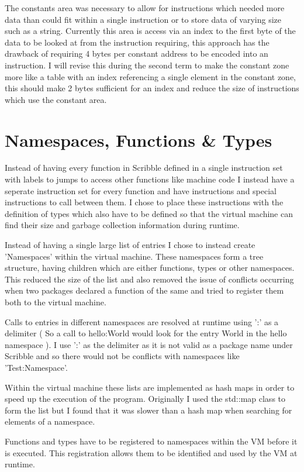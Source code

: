 \documentclass[]{final_report}
\begin{document}
The constants area was necessary to allow for instructions which needed more data than could fit within a single instruction or to store data of varying size such as a string. Currently this area is access via an index to the first byte of the data to be looked at from the instruction requiring, this approach has the drawback of requiring 4 bytes per constant address to be encoded into an instruction. I will revise this during the second term to make the constant zone more like a table with an index referencing a single element in the constant zone, this should make 2 bytes sufficient for an index and reduce the size of instructions which use the constant area.

\section{Namespaces, Functions \& Types}

Instead of having every function in Scribble defined in a single instruction set with labels to jumps to access other functions like machine code I instead have a seperate instruction set for every function and have instructions and special instructions to call between them. I chose to place these instructions with the definition of types which also have to be defined so that the virtual machine can find their size and garbage collection information during runtime.

Instead of having a single large list of entries I chose to instead create 'Namespaces' within the virtual machine. These namespaces form a tree structure, having children which are either functions, types or other namespaces. This reduced the size of the list and also removed the issue of conflicts occurring when two packages declared a function of the same and tried to register them both to the virtual machine.

Calls to entries in different namespaces are resolved at runtime using ':' as a delimiter ( So a call to
hello:World would look for the entry World in the hello namespace ). I use ':' as the delimiter as it is not valid as a package name under Scribble and so there would not be conflicts with namespaces like 'Test:Namespace'.

Within the virtual machine these lists are implemented as hash maps in order to speed up the execution of the program. Originally I used the std::map class to form the list but I found that it was slower than a hash map when searching for elements of a namespace.

Functions and types have to be registered to namespaces within the VM before it is executed. This registration allows them to be identified and used by the VM at runtime.
\end{document}
